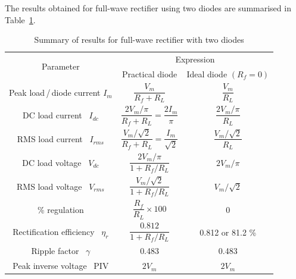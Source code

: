 The results obtained for full-wave rectifier using two diodes are
summarised in Table~\ref{tab2.2}.
\begin{table}[H]
\centering
\caption{Summary of results for full-wave rectifier with two diodes}\label{tab2.2}
\renewcommand{\arraystretch}{1.8}
\begin{tabular}{|c|c|c|}
\hline
\multirow{2}{1.5cm}{Parameter}\index{Full-wave rectifier!parameters} & \multicolumn{2}{c|}{Expression}\\\cline{2-3}
& Practical diode & Ideal diode $(R_f=0)$\\
\hline
Peak load\,/\,diode current $I_m$ & $\dfrac{V_m}{R_f + R_L}$ &
$\dfrac{V_m}{R_L}$\\[5pt]
\hline
DC load current \ $I_{dc}$ & $\dfrac{2V_m/\pi}{R_f + R_L} = \dfrac{2
  I_m}{\pi}$ & $\dfrac{2V_m/\pi}{R_L}$\\[5pt]
\hline
RMS load current \ $I_{rms}$ & $\dfrac{V_m/\sqrt{2}}{R_f +R_L} =
\dfrac{I_m}{\sqrt{2}}$ & $\dfrac{V_m/\sqrt{2}}{R_L}$\\[5pt]
\hline
DC load voltage \ $V_{dc}$ & $\dfrac{2V_m/\pi}{1+ R_f/R_L}$ & $2
V_m/\pi$\\[5pt]
\hline
RMS load voltage \ $V_{rms}$ & $\dfrac{V_m/\sqrt{2}}{1+ R_f / R_L}$ &
$V_m/\sqrt{2}$\\[5pt]
\hline
\% regulation & $\dfrac{R_f}{R_L} \times 100$ & 0\\[5pt]
\hline
Rectification efficiency \ $\eta_r$ & $\dfrac{0.812}{1 +R_f /R_L}$ &
0.812 or 81.2 \%\\[5pt]
\hline
Ripple factor \ $\gamma$ & 0.483 & 0.483\\
\hline
Peak inverse voltage \ PIV & $2 V_m$ & $2 V_m$\\
\hline
\end{tabular}
\end{table}

\eject

